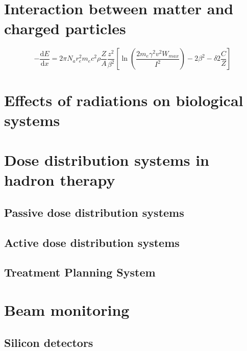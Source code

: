 \section{Interaction between matter and charged particles}


\begin{equation}\label{eq:bethe}
	-\dfrac{\mathrm dE}{\mathrm dx} = 2 \pi N_{a} r_{e}^{2} m_{e} c^{2} \rho \dfrac{Z}{A}  \dfrac{z^{2}}{\beta^{2}}\left[\ln\left(\dfrac{2m_{e} \gamma ^{2} v^{2} W_{max}}{I^{2}}\right) - 2\beta^{2} - \delta 2\frac{C}{Z}\right]
\end{equation}


\section{Effects of radiations on biological systems}

\section{Dose distribution systems in hadron therapy}

\subsection{Passive dose distribution systems}

\subsection{Active dose distribution systems}

\subsection{Treatment Planning System}

\section{Beam monitoring}

\subsection{Silicon detectors}